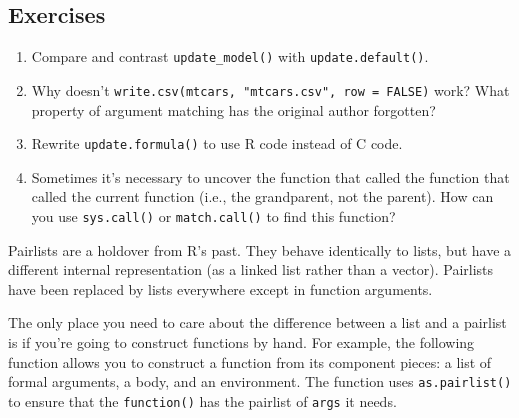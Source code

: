 \subsection{Exercises}

\begin{enumerate}
\def\labelenumi{\arabic{enumi}.}
\item
  Compare and contrast \texttt{update\_model()} with
  \texttt{update.default()}.
\item
  Why doesn't \texttt{write.csv(mtcars, "mtcars.csv", row = FALSE)}
  work? What property of argument matching has the original author
  forgotten?
\item
  Rewrite \texttt{update.formula()} to use R code instead of C code.
\item
  Sometimes it's necessary to uncover the function that called the
  function that called the current function (i.e., the grandparent, not
  the parent). How can you use \texttt{sys.call()} or
  \texttt{match.call()} to find this function?
\end{enumerate}


Pairlists are a holdover from R's past. They behave identically to
lists, but have a different internal representation (as a linked list
rather than a vector). Pairlists have been replaced by lists everywhere
except in function arguments. 

The only place you need to care about the difference between a list and
a pairlist is if you're going to construct functions by hand. For
example, the following function allows you to construct a function from
its component pieces: a list of formal arguments, a body, and an
environment. The function uses \texttt{as.pairlist()} to ensure that the
\texttt{function()} has the pairlist of \texttt{args} it needs.
 

\begin{Shaded}
\begin{Highlighting}[]
\StringTok{ } \NormalTok{()) \{}
  \StringTok{ }

  \NormalTok{(}\NormalTok{(}
\NormalTok{\}}
\end{Highlighting}
\end{Shaded}

